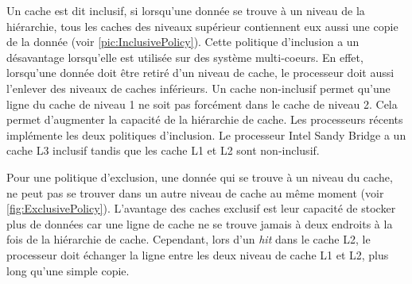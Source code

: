 Un cache est dit inclusif, si lorsqu'une donnée se trouve à un niveau de la hiérarchie, tous les caches des niveaux supérieur contiennent eux aussi une copie de la donnée (voir \autoref{pic:InclusivePolicy}). Cette politique d'inclusion a un désavantage lorsqu'elle est utilisée sur des système multi-coeurs. En effet, lorsqu'une donnée doit être retiré d'un niveau de cache, le processeur doit aussi l'enlever des niveaux de caches inférieurs. 
Un cache non-inclusif permet qu'une ligne du cache de niveau 1 ne soit pas forcément dans le cache de niveau 2. Cela permet d'augmenter la capacité de la hiérarchie de cache. Les processeurs récents implémente les deux politiques d'inclusion. Le processeur Intel Sandy Bridge a un cache L3 inclusif tandis que les cache L1 et L2 sont non-inclusif.

Pour une politique d'exclusion, une donnée qui se trouve à un niveau du cache, ne peut pas se trouver dans un autre niveau de cache au même moment (voir \autoref{fig:ExclusivePolicy}). L'avantage des caches exclusif est leur capacité de stocker plus de données car une ligne de cache ne se trouve jamais à deux endroits à la fois de la hiérarchie de cache. Cependant, lors d'un \textit{hit} dans le cache L2, le processeur doit échanger la ligne entre les deux niveau de cache L1 et L2, plus long qu'une simple copie.



